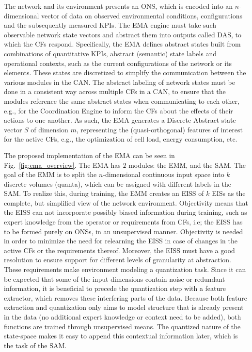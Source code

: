 		 	
	 		The network and its environment presents an \ac{ONS}, which is encoded into an $n$-dimensional vector of data on observed environmental conditions, configurations and the subsequently measured \acp{KPI}.
		 	The \ac{EMA} engine must take such observable network state vectors and abstract them into outputs called \ac{DAS}, to which the \acp{CF} respond.
 			Specifically, the \ac{EMA} defines abstract states built from combinations of quantitative \acp{KPI}, abstract (semantic) state labels and operational contexts, such as the current configurations of the network or its elements.
		 	These states are discretized to simplify the communication between the various modules in the \ac{CAN}. 
		 	The abstract labeling of network states must be done in a consistent way across multiple \acp{CF} in a \ac{CAN}, to ensure that the modules reference the same abstract states when communicating to each other, e.g., for the Coordination Engine to inform the \acp{CF} about the effects of their actions to one another. 
		 	As such, the \ac{EMA} generates a Discrete Abstract state vector $S$ of dimension $m$, representing the (quasi-orthogonal) features of interest for the active \acp{CF}, e.g., the optimization of cell load, energy consumption, etc.
		 	
		 	The proposed implementation of the \ac{EMA} can be seen in Fig.~\ref{fig:ema_overview}.
		 	The \ac{EMA} has $2$ modules: the \ac{EMM}, and the \ac{SAM}.	
		 	The goal of the \ac{EMM} is to split the $n$-dimensional continuous input space into $k$ discrete volumes (quanta), which can be assigned with different labels in the \ac{SAM}. 
		 	To realize this, during training, the \ac{EMM} creates an \ac{EISS} of $k$ \acp{EIS} as the complete, but simplified view of the network environment.		 	
		 	Objectivity means that the \ac{EISS} can not incorporate possibly biased information during training, such as expert knowledge from the operator or requirements from \acp{CF}, i.e; the \ac{EISS} has to be formed purely on \acp{ONS}, in an unsupervised manner.		 	
		 	Objectivity is needed in order to minimize the need for relearning the \ac{EISS} in case of changes in the active \acp{CF} or the requirements thereof.		 	
		 	Moreover, the \ac{EISS} must have a good resolution to ensure support for different levels of granularity at abstraction. 
		 	These requirements make environment modeling a quantization task.
		 	Since it can be expected that some of the input dimensions contain noise or redundant information, it is beneficial to precede the quantization step with a feature extractor, which removes these interfering parts of the data.
		 	Because both feature extraction and quantization only aims to model structure that is already present in the data (no additional expert knowledge or context need to be added), both functions are trained through unsupervised means.
		 	The quantized nature of the state-space makes it easy to append this contextual information later, which is the task of the \ac{SAM}.
		 	
